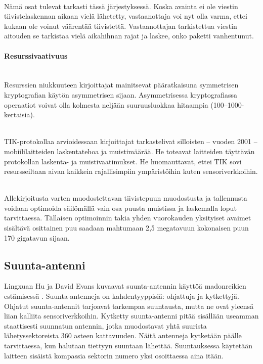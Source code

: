 \documentclass[finnish]{tktltiki2}
\theoremstyle{definition}
\theoremstyle{remark}
\begin{document}
\noindent \\
Nämä osat tulevat tarkasti tässä järjestyksessä. Koska avainta ei ole viestin tiivistelaskennan aikaan vielä lähetetty, vastaanottaja voi nyt olla varma, ettei kukaan ole voinut väärentää tiivistettä. Vastaanottajan tarkistettua viestin aitouden se tarkistaa vielä aikahihnan rajat ja laskee, onko paketti vanhentunut.

\paragraph{Resurssivaativuus} 
\noindent \\
Resurssien niukkuuteen kirjoittajat mainitsevat pääratkaisuna symmetrisen kryptografian käytön asymmetrisen sijaan. Asymmetrisessa kryptografiassa operaatiot voivat olla kolmesta neljään suuruusluokkaa hitaampia (100--1000-kertaisia).

\noindent \\
TIK-protokollaa arvioidessaan kirjoittajat tarkastelivat silloisten -- vuoden 2001 -- mobiililaitteiden laskentatehoa ja muistimäärää. He toteavat laitteiden täyttävän protokollan laskenta- ja muistivaatimukset. He huomauttavat, ettei TIK sovi resursseiltaan aivan kaikkein rajallisimpiin ympäristöihin kuten sensoriverkkoihin.

\noindent \\
Allekirjoitusta varten muodostettavan tiivistepuun muodostusta ja tallennusta voidaan optimoida säilömällä vain osa puusta muistissa ja laskemalla loput tarvittaessa. Tällaisen optimoinnin takia yhden vuorokauden yksityiset avaimet sisältävä osittainen puu saadaan mahtumaan 2,5 megatavuun kokonaisen puun 170 gigatavun sijaan.

\subsection{Suunta-antenni}
Lingxuan Hu ja David Evans kuvaavat suunta-antennin käyttöä madonreikien estämisessä \cite{antenna}. Suunta-antenneja on kahdentyyppisiä: ohjattuja ja kytkettyjä. Ohjatut suunta-antennit tarjoavat tarkempaa suuntausta, mutta ne ovat yleensä liian kalliita sensoriverkkoihin. Kytketty suunta-antenni pitää sisällään useamman staattisesti suunnatun antennin, jotka muodostavat yhtä suurista lähetyssektoreista 360 asteen kattavuuden. Näitä antenneja kytketään päälle tarvittaessa, kun halutaan tiettyyn suuntaan lähettää. Suuntauksessa käytetään laitteen sisäistä kompassia sektorin numero yksi osoittaessa aina itään.
\end{document}
